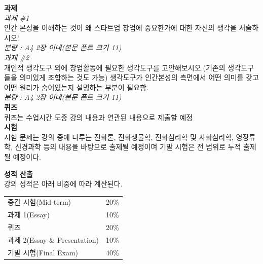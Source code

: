 \documentclass[11pt,letterpaper]{article}
\newcommand{\lefthead}[2]{\noindent\textbf{#1}\hfill\\[#2]}
\begin{document}
\lefthead{과제}{0.3cm}
\noindent \emph{과제 \#1} \\


\noindent 인간 본성을 이해하는 것이 왜 스타트업 창업에 중요한가에 대한 자신의 생각을 서술하시오! \\

\emph{분량 : A4 2장 이내(본문 폰트 크기 11)}  \\


\noindent \emph{과제 \#2}  \\[0.3cm]

\noindent 개인적 생각도구 외에 창업활동에 필요한 생각도구를 고안해보시오.(기존의 생각도구들을 의미있게 조합하는 것도 가능) 생각도구가 인간본성의 측면에서 어떤 의미를 갖고 어떤 원리가 숨어있는지 설명하는 부분이 필요함.\\

\emph{분량 : A4 2장 이내(본문 폰트 크기 11)}  \\




\lefthead{퀴즈}{0.3cm}
\noindent 퀴즈는 수업시간 도중 강의 내용과 연관된 내용으로 제출할 예정 \\[0.3cm]






\lefthead{시험}{0.3cm}
\noindent  시험 문제는 강의 중에 다루는 진화론, 진화생물학, 진화심리학 및 사회심리학, 영장류학, 신경과학 등의 내용을 바탕으로 출제될 예정이며 기말 시험은 전 범위로 누적 출제될 예정이다. \\
[0.3cm]

\newpage


\lefthead{성적 산출}{0.3cm}
\noindent 강의 성적은 아래 비중에 따라 계산된다.
	\begin{table}[H]
	\centering
	\begin{tabular}{ll}
        중간 시험(Mid-term) & 20\% \\
        과제 1(Essay) & 10\% \\
        퀴즈 & 20\% \\
        과제 2(Essay \& Presentation) & 10\% \\
        기말 시험(Final Exam) & 40\%
        \end{tabular}
        \end{table} \vspace{0.3cm}
\end{document}

